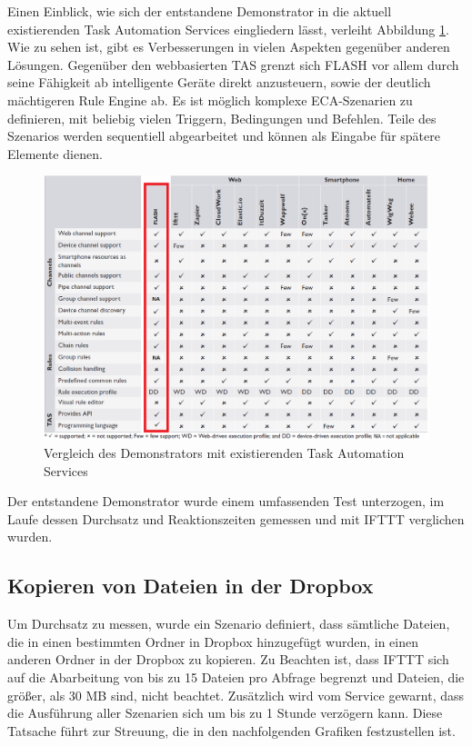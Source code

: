 Einen Einblick, wie sich der entstandene Demonstrator in die aktuell existierenden Task Automation Services eingliedern lässt, verleiht Abbildung \ref{fig:eval0}. Wie zu sehen ist, gibt es Verbesserungen in vielen Aspekten gegenüber anderen Lösungen. Gegenüber den webbasierten TAS grenzt sich FLASH vor allem durch seine Fähigkeit ab intelligente Geräte direkt anzusteuern, sowie der deutlich mächtigeren Rule Engine ab. Es ist möglich komplexe ECA-Szenarien zu definieren, mit beliebig vielen Triggern, Bedingungen und Befehlen. Teile des Szenarios werden sequentiell abgearbeitet und können als Eingabe für spätere Elemente dienen.\\

\begin{figure}
	\centering
	\includegraphics[width=\textwidth]{bilder/TASOverview_eval}
	\caption{Vergleich des Demonstrators mit existierenden Task Automation Services}
	\label{fig:eval0}
\end{figure}


Der entstandene Demonstrator wurde einem umfassenden Test unterzogen, im Laufe dessen Durchsatz und Reaktionszeiten gemessen und mit IFTTT verglichen wurden. 

\subsection{Kopieren von Dateien in der Dropbox}
Um Durchsatz zu messen, wurde ein Szenario definiert, dass sämtliche Dateien, die in einen bestimmten Ordner in Dropbox hinzugefügt wurden, in einen anderen Ordner in der Dropbox zu kopieren. Zu Beachten ist, dass IFTTT sich auf die Abarbeitung von bis zu 15 Dateien pro Abfrage begrenzt und Dateien, die größer, als 30 MB sind, nicht beachtet. Zusätzlich wird vom Service gewarnt, dass die Ausführung aller Szenarien sich um bis zu 1 Stunde verzögern kann. Diese Tatsache führt zur Streuung, die in den nachfolgenden Grafiken festzustellen ist.

